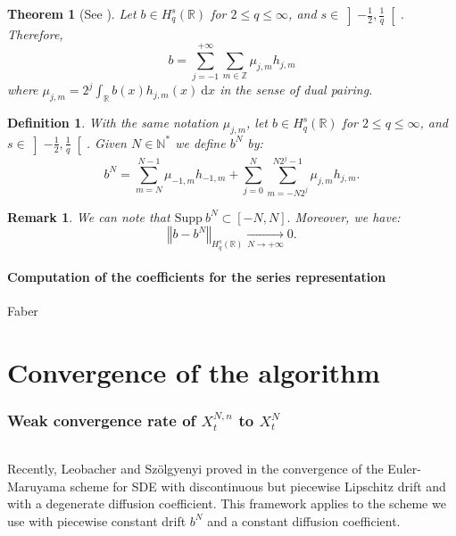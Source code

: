 \documentclass[11pt]{enstaPRE}
\newtheorem{defi}{Definition}
\newtheorem{theo}{Theorem}
\newtheorem{rem}{Remark}
\newcommand{\norme}[1]{\left\Vert #1\right\Vert}
\newcommand{\R}{\mathbb{R}}
\newcommand{\Z}{\mathbb{Z}}
\newcommand{\N}{\mathbb{N}}
\newcommand{\di}{\mathrm{d}}
\begin{document}
\begin{theo}[See \cite{Iss-Rus-2200}]
    Let $b\in H^s_q(\R)$ for $2\leq q \leq \infty$, and $s\in\left]-\frac{1}{2},\frac{1}{q}\right[$. Therefore,
    \begin{equation}
    b = \sum_{j=-1}^{+\infty}\sum_{m\in\Z}\mu_{j,m}h_{j,m}
    \end{equation}
    where $\mu_{j,m} = 2^j\int_{\R}b(x)h_{j,m}(x)\ \di x$ in the sense of dual pairing.
\end{theo}

\begin{defi}
    With the same notation $\mu_{j,m} $, let $b\in H^s_q(\R)$ for $2\leq q \leq \infty$, and $s\in\left]-\frac{1}{2},\frac{1}{q}\right[$. Given $N\in\N^*$ we define $b^N$ by:
    \begin{equation}
    b^N = \sum_{m=N}^{N-1}\mu_{-1,m}h_{-1,m}+\sum_{j=0}^{N}\sum_{m=-N2^j}^{N2^j-1}\mu_{j,m}h_{j,m}.
    \end{equation}
\end{defi}

\begin{rem}
    We can note that $\mathrm{Supp}\ b^N\subset [-N,N].$ Moreover, we have: $$\norme{b-b^N}_{H_q^s(\R)} \underset{N\rightarrow+\infty}{\longrightarrow} 0.$$
\end{rem}

\subsection{Computation of the coefficients for the series representation}
Faber 

\part{Convergence of the algorithm}

\section{Weak convergence rate of $X_t^{N,n}$ to $X_t^N$}
\paragraph{}
Recently, Leobacher and Szölgyenyi proved in \cite{Leo-Szo} the convergence of the Euler-Maruyama scheme for SDE with discontinuous but piecewise Lipschitz drift and with a degenerate diffusion coefficient. This framework applies to the scheme we use with piecewise constant drift $b^N$ and a constant diffusion coefficient.
\end{document}

